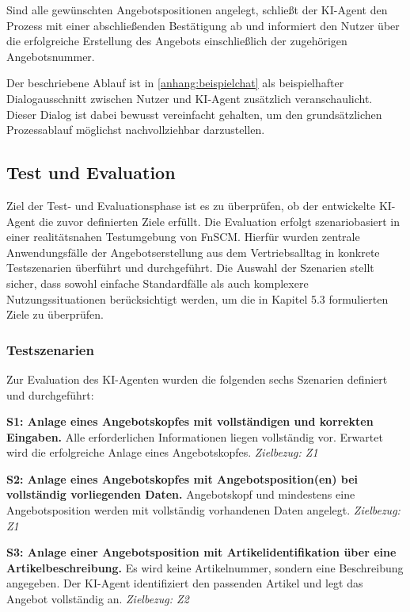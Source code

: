 Sind alle gewünschten Angebotspositionen angelegt, schließt der \ac{KI}-Agent den Prozess mit einer abschließenden Bestätigung ab und informiert den Nutzer über die erfolgreiche Erstellung des Angebots einschließlich der zugehörigen Angebotsnummer.

Der beschriebene Ablauf ist in \ref{anhang:beispielchat} als beispielhafter Dialogausschnitt zwischen Nutzer und \ac{KI}-Agent zusätzlich veranschaulicht. Dieser Dialog ist dabei bewusst vereinfacht gehalten, um den grundsätzlichen Prozessablauf möglichst nachvollziehbar darzustellen.


\subsection{Test und Evaluation}

Ziel der Test- und Evaluationsphase ist es zu überprüfen, ob der entwickelte \ac{KI}-Agent die zuvor definierten Ziele erfüllt. Die Evaluation erfolgt szenariobasiert in einer realitätsnahen Testumgebung von FnSCM. Hierfür wurden zentrale Anwendungsfälle der Angebotserstellung aus dem Vertriebsalltag in konkrete Testszenarien überführt und durchgeführt. Die Auswahl der Szenarien stellt sicher, dass sowohl einfache Standardfälle als auch komplexere Nutzungssituationen berücksichtigt werden, um die in Kapitel 5.3 formulierten Ziele zu überprüfen.

\subsubsection{Testszenarien}

Zur Evaluation des \ac{KI}-Agenten wurden die folgenden sechs Szenarien definiert und durchgeführt:

\textbf{S1: Anlage eines Angebotskopfes mit vollständigen und korrekten Eingaben.} \newline 
    Alle erforderlichen Informationen liegen vollständig vor. Erwartet wird die erfolgreiche Anlage eines Angebotskopfes.\newline 
\textit{Zielbezug: Z1}

\textbf{S2: Anlage eines Angebotskopfes mit Angebotsposition(en) bei vollständig vorliegenden Daten.} \newline  
    Angebotskopf und mindestens eine Angebotsposition werden mit vollständig vorhandenen Daten angelegt.\newline 
\textit{Zielbezug: Z1}

\textbf{S3: Anlage einer Angebotsposition mit Artikelidentifikation über eine Artikelbeschreibung.}  \newline 
    Es wird keine Artikelnummer, sondern eine Beschreibung angegeben. Der \ac{KI}-Agent identifiziert den passenden Artikel und legt das Angebot vollständig an.\newline 
\textit{Zielbezug: Z2}

